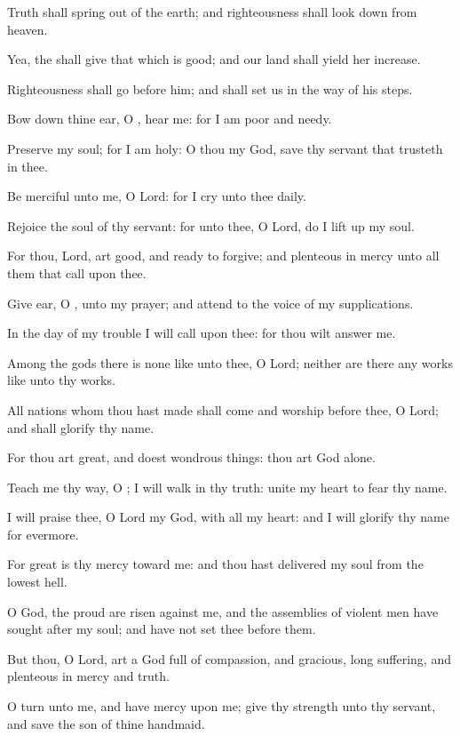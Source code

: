 \Verse Truth shall spring out of the earth; and righteousness shall look down from heaven.

\Verse Yea, the \LORD shall give that which is good; and our land shall yield her increase.

\Verse Righteousness shall go before him; and shall set us in the way of his steps.




\Chapter
\Verse Bow down thine ear, O \LORD, hear me: for I am poor and needy.

\Verse Preserve my soul; for I am holy: O thou my God, save thy servant that trusteth in thee.

\Verse Be merciful unto me, O Lord: for I cry unto thee daily.

\Verse Rejoice the soul of thy servant: for unto thee, O Lord, do I lift up my soul.

\Verse For thou, Lord, art good, and ready to forgive; and plenteous in mercy unto all them that call upon thee.

\Verse Give ear, O \LORD, unto my prayer; and attend to the voice of my supplications.

\Verse In the day of my trouble I will call upon thee: for thou wilt answer me.

\Verse Among the gods there is none like unto thee, O Lord; neither are there any works like unto thy works.

\Verse All nations whom thou hast made shall come and worship before thee, O Lord; and shall glorify thy name.

\Verse For thou art great, and doest wondrous things: thou art God alone.

\Verse Teach me thy way, O \LORD; I will walk in thy truth: unite my heart to fear thy name.

\Verse I will praise thee, O Lord my God, with all my heart: and I will glorify thy name for evermore.

\Verse For great is thy mercy toward me: and thou hast delivered my soul from the lowest hell.

\Verse O God, the proud are risen against me, and the assemblies of violent men have sought after my soul; and have not set thee before them.

\Verse But thou, O Lord, art a God full of compassion, and gracious, long suffering, and plenteous in mercy and truth.

\Verse O turn unto me, and have mercy upon me; give thy strength unto thy servant, and save the son of thine handmaid.

